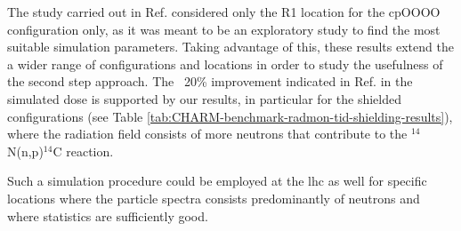 \documentclass[encoding=utf8,british]{tumphthesis}
\begin{document}
The study carried out in Ref. \cite{CHARM:parametric-study} considered only the R1 location for the cpOOOO configuration only, as it was meant to be an exploratory study to find the most suitable simulation parameters. Taking advantage of this, these results extend the a wider range of configurations and locations in order to study the usefulness of the second step approach. The ~20\% improvement indicated in Ref. \cite{CHARM:parametric-study} in the simulated dose is supported by our results, in particular for the shielded configurations (see Table \ref{tab:CHARM-benchmark-radmon-tid-shielding-results}), where the radiation field consists of more neutrons that contribute to the $^{14}$N(n,p)$^{14}$C reaction. 

Such a simulation procedure could be employed at the \acrshort{lhc} as well for specific locations where the particle spectra consists predominantly of neutrons and where statistics are sufficiently good.
\end{document}
